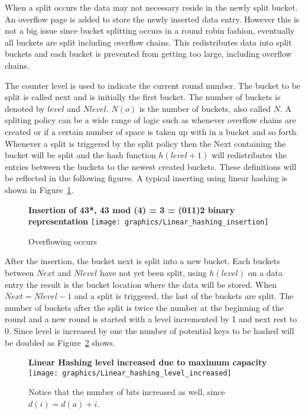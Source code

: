 \documentclass[letterpaper, 12pt]{article}
\begin{document}
When a split occurs the data may not necessary reside in the newly split bucket. An overflow page is
added to store the newly inserted data entry. However this is not a big issue since bucket splitting
occurs in a round robin fashion, eventually all buckets are split including overflow chains.
This redistributes data into split buckets and each bucket is prevented from getting too large,
including overflow chains.
\par\vspace{\baselineskip}
The counter level is used to indicate the current round number. The bucket to be split is called
next and is initially the first bucket. The number of buckets is denoted by $level$ and $Nlevel$.
$N(o)$ is the number of buckets, also called $N$. A spliting policy can be a wide range of logic
such as whenever overflow chains are created or if a certain number of space is taken up with
in a bucket and so forth. Whenever a split is triggered by the split policy then the Next containing
the bucket will be split and the hash function $h(level+1)$ will redistributes the entries
between the buckets to the newest created buckets. These definitions will be reflected in the following
figures. A typical inserting using linear hashing is shown in Figure~\ref{fig:linear_hash_insert}.
\par\vspace{\baselineskip}

\begin{figure}
  \centering
  \textbf{Insertion of 43*, 43 mod (4) = 3 = (011)2 binary representation}
  \texttt{[image: graphics/Linear\_hashing\_insertion]}
  \caption{Overflowing occurs}
  \label{fig:linear_hash_insert}
\end{figure}

After the insertion, the bucket next is split into a new bucket. Each buckets between $Next$ and $Nlevel$ have not yet been split,
using $h(level)$ on a data entry the result is the bucket location where the data will be stored.
When $Next = Nlevel - 1$ and a split is triggered, the last of the buckets are split. The 
number of buckets after the split is twice the number at the beginning of the round and a new round is 
started with a level incremented by 1 and next rest to 0. Since level is increased by one the number 
of potential keys to be hashed will be doubled as Figure~\ref{fig:linear_hash_level_inc} shows.
\par\vspace{\baselineskip}
\begin{figure}
  \centering
  \textbf{Linear Hashing level increased due to maximum capacity}
  \texttt{[image: graphics/Linear\_hashing\_level\_increased]}
  \caption{Notice that the number of bits increased as well, since $d(i) = d(a) + i$.}
  \label{fig:linear_hash_level_inc}
\end{figure}
\end{document}
